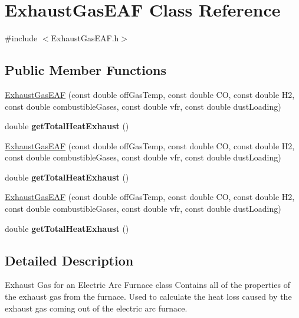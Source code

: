 \hypertarget{class_exhaust_gas_e_a_f}{}\section{Exhaust\+Gas\+E\+AF Class Reference}
\label{class_exhaust_gas_e_a_f}


{\ttfamily \#include $<$Exhaust\+Gas\+E\+A\+F.\+h$>$}

\subsection*{Public Member Functions}
\begin{DoxyCompactItemize}
\item 
\hyperlink{class_exhaust_gas_e_a_f_a500eba1e0016803cb94485594354f36a}{Exhaust\+Gas\+E\+AF} (const double off\+Gas\+Temp, const double CO, const double H2, const double combustible\+Gases, const double vfr, const double dust\+Loading)
\item 
\mbox{\label{class_exhaust_gas_e_a_f_a5f6442dab618e142b4ce43fcfb11d0cb}} 
double {\bfseries get\+Total\+Heat\+Exhaust} ()
\item 
\hyperlink{class_exhaust_gas_e_a_f_a500eba1e0016803cb94485594354f36a}{Exhaust\+Gas\+E\+AF} (const double off\+Gas\+Temp, const double CO, const double H2, const double combustible\+Gases, const double vfr, const double dust\+Loading)
\item 
\mbox{\label{class_exhaust_gas_e_a_f_a5f6442dab618e142b4ce43fcfb11d0cb}} 
double {\bfseries get\+Total\+Heat\+Exhaust} ()
\item 
\hyperlink{class_exhaust_gas_e_a_f_a500eba1e0016803cb94485594354f36a}{Exhaust\+Gas\+E\+AF} (const double off\+Gas\+Temp, const double CO, const double H2, const double combustible\+Gases, const double vfr, const double dust\+Loading)
\item 
\mbox{\label{class_exhaust_gas_e_a_f_a5f6442dab618e142b4ce43fcfb11d0cb}} 
double {\bfseries get\+Total\+Heat\+Exhaust} ()
\end{DoxyCompactItemize}


\subsection{Detailed Description}
Exhaust Gas for an Electric Arc Furnace class Contains all of the properties of the exhaust gas from the furnace. Used to calculate the heat loss caused by the exhaust gas coming out of the electric arc furnace. 

